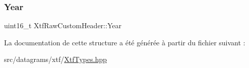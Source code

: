 \mbox{\label{structXtfRawCustomHeader_a144ce6ccb291675a42ba82b6bf3618d9}} 
\subsubsection{\texorpdfstring{Year}{Year}}
{\footnotesize\ttfamily uint16\+\_\+t Xtf\+Raw\+Custom\+Header\+::\+Year}



La documentation de cette structure a été générée à partir du fichier suivant \+:\begin{DoxyCompactItemize}
\item 
src/datagrams/xtf/\hyperlink{XtfTypes_8hpp}{Xtf\+Types.\+hpp}\end{DoxyCompactItemize}
